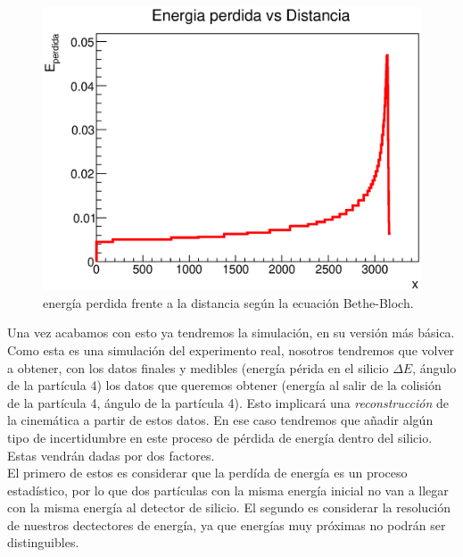 \documentclass[12pt,a4paper]{article}
\numberwithin{equation}{section}
\numberwithin{figure}{section}
\begin{document}
\begin{enumerate}
    \begin{figure}[h!] \centering
        \includegraphics[scale=0.7]{srim.eps}
        \caption{energía perdida frente a la distancia según la ecuación Bethe-Bloch.}
        \label{Fig:energia_perdida}
    \end{figure}

\end{enumerate}

Una vez acabamos con esto ya tendremos la simulación, en su versión más básica. Como esta es una simulación del experimento real, nosotros tendremos que volver a obtener, con los datos finales y medibles (energía périda en el silicio $\Delta E$, ángulo de la partícula 4) los datos que queremos obtener (energía al salir de la colisión de la partícula 4, ángulo de la partícula 4). Esto implicará una {\it reconstrucción} de la cinemática a partir de estos datos. En ese caso tendremos que añadir algún tipo de incertidumbre en este proceso de pérdida de energía dentro del silicio. Estas vendrán dadas por dos factores. \\


El primero de estos es considerar que la perdída de energía es un proceso estadístico, por lo que dos partículas con la misma energía inicial no van a llegar con la misma energía al detector de silicio. El segundo es considerar la resolución de nuestros dectectores de energía, ya que energías muy próximas no podrán ser distinguibles. 
\end{document}
